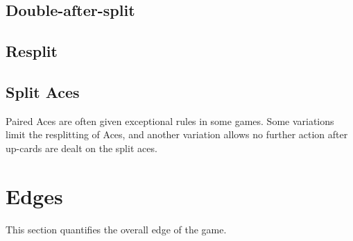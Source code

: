 \subsection{Double-after-split}
\label{sec:basic:DAS}

\subsection{Resplit}
\label{sec:basic:resplit}

\subsection{Split Aces}
\label{sec:basic:split-aces}

Paired Aces are often given exceptional rules in some games.
Some variations limit the resplitting of Aces, 
and another variation allows no further action after
up-cards are dealt on the split aces.  


\section{Edges}
\label{sec:basic:edges}

This section quantifies the overall edge of the game.

